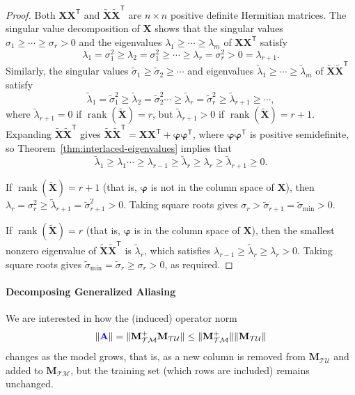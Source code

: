 \documentclass[twocolumn,aps,prx,superscriptaddress,10pt]{revtex4-2}
\newcommand{\0}{\bm{0}}
\newcommand{\bphi}{\boldsymbol{\varphi}}
\newcommand{\M}{\mathcal{M}} %
\newcommand{\T}{\mathcal{T}} %
\newcommand{\U}{\mathcal{U}} %
\newcommand{\bbA}{{\color{blue}{\mathbf{A}}}}  %
\newcommand{\bbM}{\mathbf{M}}
\newcommand{\bbX}{\mathbf{X}}
\newcommand{\MTM}{\bbM_{\T\M}}
\newcommand{\MTU}{\bbM_{\T\U}}
\DeclareMathOperator{\rank}{rank}
\newcommand{\trp}{^{\mathsf{T}}}  %
\begin{document}
\begin{proof}
Both $\bbX \bbX\trp$ and $\widetilde{\bbX}\widetilde{\bbX}\trp$ are $n \times n$ positive definite Hermitian matrices.
The singular value decomposition of $\bbX$ shows that the singular values $\sigma_1\ge \cdots \ge \sigma_r >0$ and the eigenvalues $\lambda_1\ge \cdots \ge \lambda_m$ of $\bbX \bbX\trp$ satisfy 
\[
\lambda_1 =\sigma^2_1 \ge \lambda_2 = \sigma^2_1 \ge \cdots \ge \lambda_r = \sigma^2_r > 0 = \lambda_{r+1}.  
\]
Similarly, the singular values $\widetilde{\sigma}_1 \ge \widetilde{\sigma}_2 \ge \cdots$ and eigenvalues $\widetilde{\lambda}_1 \ge \cdots \ge \widetilde{\lambda}_m$ of $\widetilde{\bbX} \widetilde{\bbX}\trp$ satisfy
\[
\widetilde{\lambda}_1 = \widetilde{\sigma}^2_1 \ge \widetilde{\lambda}_2 = \widetilde{\sigma}^2_2 \cdots \ge \widetilde{\lambda}_r = \widetilde{\sigma}^2_r \ge  \widetilde{\lambda}_{r+1} \ge \cdots,
\]
where $\widetilde{\lambda}_{r+1} = 0$ if $\rank(\widetilde{\bbX}) = r$, but $\widetilde{\lambda}_{r+1} > 0$  if $\rank(\widetilde{\bbX}) = r+1$.
Expanding $\widetilde{\bbX}\widetilde{\bbX}\trp$ gives
$\widetilde{\bbX}\widetilde{\bbX}\trp = \bbX \bbX\trp + \bphi\bphi\trp$,
where $\bphi \bphi\trp$ is positive semidefinite, so Theorem~\ref{thm:interlaced-eigenvalues} implies that 
\[
\widetilde{\lambda}_1 \ge \lambda_1 \cdots \ge \lambda_{r-1} \ge \widetilde{\lambda}_r \ge \lambda_r \ge \widetilde{\lambda}_{r+1} \ge 0. 
\]

If $\rank(\widetilde{\bbX}) = r+1$ (that is, $\bphi$ is not in the column space of $\bbX$), then 
$
\lambda_r = \sigma^2_r \ge \widetilde{\lambda}_{r+1} = \widetilde{\sigma}^2_{r+1} >0$.
Taking square roots gives  
$\sigma_r > \widetilde{\sigma}_{r+1} = \widetilde{\sigma}_{\mathrm{min}} > 0$.

If $\rank(\widetilde{\bbX}) = r$ (that is, $\bphi$ is in the column space of $\bbX$), then the smallest nonzero eigenvalue of  $\widetilde{\bbX}\widetilde{\bbX}\trp$ is $\widetilde{\lambda}_r$, which satisfies  
$\lambda_{r-1} \ge \widetilde{\lambda}_r \ge \lambda_r > 0$. 
Taking square roots gives 
$\widetilde{\sigma}_{\mathrm{min}}=\widetilde{\sigma}_{r}  \ge \sigma_r > 0$, as required.
\end{proof}


\paragraph{Decomposing Generalized Aliasing}
We are interested in how the (induced) operator norm 
\[
\|\bbA\| = \|\MTM^+ \MTU\| \le \|\MTM^+\| \|\MTU\|
\]
changes as the model grows, that is, as a new column is removed from $\MTU$ and added to $\MTM$, but the training set (which rows are included) remains unchanged.
\end{document}
